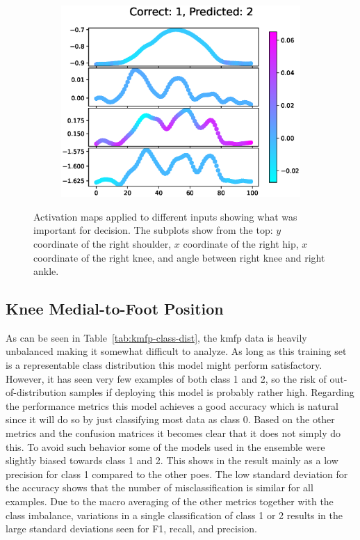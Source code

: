 \begin{figure}[h]
\begin{subfigure}[t]{0.32\textwidth}
    \includegraphics[width=\textwidth]{files/figs/res/femval/gradcam/12.eps}
    \caption{}
    \label{fig:femval-12}
  \end{subfigure}
  \caption{Activation maps applied to different inputs showing what was important for decision. The subplots show from the top: $y$ coordinate of the right shoulder, $x$ coordinate of the right hip, $x$ coordinate of the right knee, and angle between right knee and right ankle.}
  \label{fig:gradcam}
\end{figure}




\FloatBarrier
\subsection{Knee Medial-to-Foot Position}
As can be seen in Table~\ref{tab:kmfp-class-dist}, the \gls{kmfp} data is heavily unbalanced making it somewhat difficult to analyze. As long as this training set is a representable class distribution this model might perform satisfactory. However, it has seen very few examples of both class 1 and 2, so the risk of out-of-distribution samples if deploying this model is probably rather high. Regarding the performance metrics this model achieves a good accuracy which is natural since it will do so by just classifying most data as class 0. Based on the other metrics and the confusion matrices it becomes clear that it does not simply do this. To avoid such behavior some of the models used in the ensemble were slightly biased towards class 1 and 2. This shows in the result mainly as a low precision for class 1 compared to the other \glspl{poe}. The low standard deviation for the accuracy shows that the number of misclassification is similar for all examples. Due to the macro averaging of the other metrics together with the class imbalance, variations in a single classification of class 1 or 2 results in the large standard deviations seen for F1, recall, and precision.

